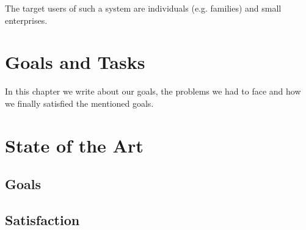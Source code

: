 The target users of such a system are individuals (e.g. families) and small enterprises.

\section{Goals and Tasks}

In this chapter we write about our goals, the problems we had to face and how we finally satisfied the mentioned goals.

\section{State of the Art}

\subsection{Goals}

\subsection{Satisfaction}
